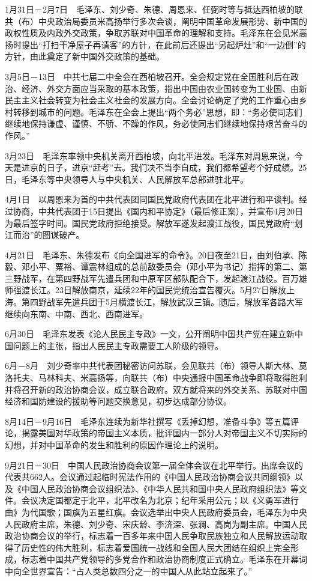 \documentclass[10pt,a4paper,twocolumn]{book}
\begin{document}
1月31日－2月7日　毛泽东、刘少奇、朱德、周恩来、任弼时等与抵达西柏坡的联共（布）中央政治局委员米高扬举行多次会谈，阐明中国革命发展形势、新中国的政权性质及内政外交政策，争取苏联对中国革命的理解和支持。毛泽东在会见米高扬时提出“打扫干净屋子再请客”的方针，在此前后还提出“另起炉灶”和“一边倒”的方针，由此奠定了新中国外交政策的基础。

3月5日－13日　中共七届二中全会在西柏坡召开。全会规定党在全国胜利后在政治、经济、外交方面应当采取的基本政策，指出中国由农业国转变为工业国、由新民主主义社会转变为社会主义社会的发展方向。全会讨论确定了党的工作重心由乡村转移到城市的问题。毛泽东在全会上提出“两个务必”思想，即：“务必使同志们继续地保持谦虚、谨慎、不骄、不躁的作风，务必使同志们继续地保持艰苦奋斗的作风。”

3月23日　毛泽东率领中央机关离开西柏坡，向北平进发。毛泽东对周恩来说，今天是进京的日子，进京“赶考”去。我们决不当李自成，我们都希望考个好成绩。25日，毛泽东等中央领导人与中央机关、人民解放军总部进驻北平。

4月1日　以周恩来为首的中共代表团同国民党政府代表团在北平进行和平谈判。经过协商，中共代表团于15日提出《国内和平协定》（最后修正案），并宣布4月20日为最后签字时间。国民党政府拒绝接受。解放军遂发起渡江战役，国民党政府“划江而治”的图谋破产。

4月21日　毛泽东、朱德发布《向全国进军的命令》。20日夜至21日，由刘伯承、陈毅、邓小平、粟裕、谭震林组成的总前敌委员会（邓小平为书记）指挥的第二、第三野战军，在第四野战军先遣兵团和中原军区部队配合下，发起渡江战役。百万雄师强渡长江。23日解放南京，延续22年的国民党统治宣告覆灭。5月27日解放上海。第四野战军先遣兵团于5月横渡长江，解放武汉三镇。随后，解放军各路大军继续向东南、中南、西北、西南进军。

6月30日　毛泽东发表《论人民民主专政》一文，公开阐明中国共产党在建立新中国问题上的主张，指出人民民主专政需要工人阶级的领导。

6月－8月　刘少奇率中共代表团秘密访问苏联，会见联共（布）领导人斯大林、莫洛托夫、马林科夫、米高扬等，向联共（布）中央通报中国革命战争即将取得胜利并将召开新的政治协商会议，成立联合政府。双方就将来的外交关系、苏联对中国经济和国防建设的援助等问题交换意见，初步达成部分协议。

8月14日－9月16日　毛泽东连续为新华社撰写《丢掉幻想，准备斗争》等五篇评论，揭露美国对华政策的帝国主义本质，批评国内一部分人对帝国主义不切实际的幻想，并对中国革命的发生和胜利的原因作理论上的说明。

9月21日－30日　中国人民政治协商会议第一届全体会议在北平举行。出席会议的代表共662人。会议通过起临时宪法作用的《中国人民政治协商会议共同纲领》以及《中国人民政治协商会议组织法》、《中华人民共和国中央人民政府组织法》等文件。会议决定国都定于北平，北平改名为北京；纪年采用公元；以《义勇军进行曲》为代国歌；国旗为五星红旗。会议选举出中央人民政府委员会，毛泽东为中央人民政府主席，朱德、刘少奇、宋庆龄、李济深、张澜、高岗为副主席。中国人民政治协商会议的举行，标志着一百多年来中国人民争取民族独立和人民解放运动取得了历史性的伟大胜利，标志着爱国统一战线和全国人民大团结在组织上完全形成，标志着中国共产党领导的多党合作和政治协商制度正式确立。毛泽东在开幕词中向全世界宣告：“占人类总数四分之一的中国人从此站立起来了。”
\end{document}
